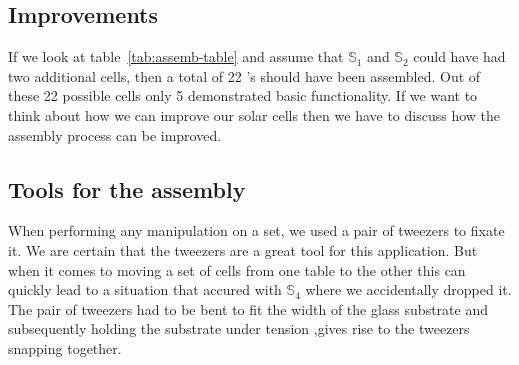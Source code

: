 \documentclass[a4paper,10pt,twocolumn]{article}
\begin{document}
\begin{extract*}

\section{Improvements}
If we look at table~\ref{tab:assemb-table} and assume that $\mathbb{S}_1$ and $\mathbb{S}_2$ could have had two additional cells, then a total of 22 \BHSC’s should have been assembled. Out of these 22 possible cells only 5 demonstrated basic functionality. If we want to think about how we can improve our solar cells then we have to discuss how the assembly process can be improved.

\subsection{Tools for the assembly}
When performing any manipulation on a set, we used a pair of tweezers to fixate it. We are certain that the tweezers are a great tool for this application. But when it comes to moving a set of cells from one table to the other this can quickly lead to a situation that accured with $\mathbb{S}_4$ where we accidentally dropped it. The pair of tweezers had to be bent to fit the width of the glass substrate and subsequently holding the substrate under tension ,gives rise to the tweezers snapping together. 

\end{extract*}
\end{document}
